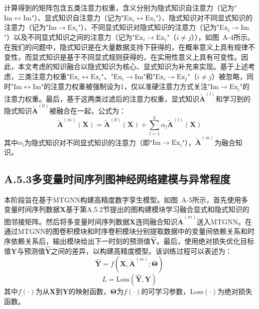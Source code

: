 计算得到的矩阵包含五类注意力权重，含义分别为隐式知识自注意力（记为"$\mathrm{Im} \leftrightarrow \mathrm{Im}$"）、显式知识自注意力（记为"$\mathrm{Ex}_i \leftrightarrow \mathrm{Ex}_i$"）、隐式知识对不同显式知识的注意力（记为"$\mathrm{Im} \rightarrow \mathrm{Ex}_i$"）、不同显式知识对隐式知识的注意力（记为"$\mathrm{Ex}_i \rightarrow \mathrm{Im}$"）以及不同显式知识之间的注意力（记为"$\mathrm{Ex}_i \rightarrow \mathrm{Ex}_j$"（$i \neq j$）），如图~A-4所示。在我们的问题中，隐式知识是在大量数据支持下获得的，在概率意义上具有规律不变性，而显式知识是基于不同显式规则获得的，在实用性意义上具有可变性。因此，本文考虑的知识融合以隐式知识为核心、显式知识为补充来实现。基于上述考虑，三类注意力权重"$\mathrm{Ex}_i \leftrightarrow \mathrm{Ex}_i$"、"$\mathrm{Ex}_i \rightarrow \mathrm{Im}$"和"$\mathrm{Ex}_i \rightarrow \mathrm{Ex}_j$"（$i \neq j$）被忽略，同时"$\mathrm{Im} \leftrightarrow \mathrm{Im}$"的注意力权重被强制设为1，仅以准硬注意力方式关注"$\mathrm{Im} \rightarrow \mathrm{Ex}_i$"的注意力权重。最后，基于这两类过滤后的注意力权重，显式知识$\tilde{\boldsymbol{A}}^{(l)}$和学习到的隐式知识$\tilde{\boldsymbol{A}}^{(0)}$被融合在一起，公式为：
\begin{equation}
\tilde{\boldsymbol{A}}^{(m)}(\boldsymbol{X}) = \tilde{\boldsymbol{A}}^{(0)}(\boldsymbol{X}) + \sum_{l=1}^{L} \alpha_l \tilde{\boldsymbol{A}}^{(l)}(\boldsymbol{X})
\end{equation}
其中$\alpha_l$为隐式知识对不同显式知识的注意力（即"$\mathrm{Im} \rightarrow \mathrm{Ex}_i$"），$\tilde{\boldsymbol{A}}^{(m)}$为融合知识。


\subsection*{A.5.3\quad 多变量时间序列图神经网络建模与异常程度}

本阶段旨在基于MTGNN构建高精度数字孪生模型。如图~A-5所示，首先使用多变量时间序列数据$\boldsymbol{X}$基于第A.5.2节提出的图构建模块学习融合显式和隐式知识的图邻接矩阵。然后将多变量时间序列数据$\boldsymbol{X}$连同融合知识$\tilde{\boldsymbol{A}}^{(m)}$送入MTGNN。在通过MTGNN的图卷积模块和时序卷积模块分别提取数据中的变量间依赖关系和时序依赖关系后，输出模块给出下一时刻的预测值$\hat{\boldsymbol{Y}}$。最后，使用绝对损失优化目标值$\boldsymbol{Y}$与预测值$\hat{\boldsymbol{Y}}$之间的差异，以构建高精度模型。该训练过程可以表述为：
\begin{equation}
\hat{\boldsymbol{Y}} = f\left(\boldsymbol{X}, \tilde{\boldsymbol{A}}^{(m)}; \boldsymbol{\Theta}\right)
\end{equation}
\begin{equation}
L = \mathrm{Loss}(\hat{\boldsymbol{Y}}, \boldsymbol{Y})
\end{equation}
其中$f(\cdot)$为从$\boldsymbol{X}$到$\boldsymbol{Y}$的映射函数，$\boldsymbol{\Theta}$为$f(\cdot)$的可学习参数，$\mathrm{Loss}(\cdot)$为绝对损失函数。

